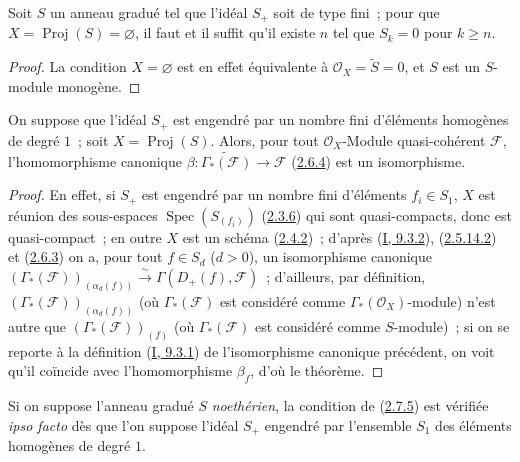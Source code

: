 \begin{corollary}[2.7.4]
\label{II.2.7.4-fr}
Soit $S$ un anneau gradué tel que l'idéal $S_+$ soit de type fini~; pour que
$X=\operatorname{Proj}(S)=\varnothing$, il faut et il suffit qu'il existe $n$
tel que $S_k=0$ pour $k\geq n$.
\end{corollary}

\begin{proof}
La condition $X=\varnothing$ est en effet équivalente à
$\mathcal{O}_X=\widetilde{S}=0$, et $S$ est un $S$-module monogène.
\end{proof}

\begin{theorem}[2.7.5]
\label{II.2.7.5-fr}
On suppose que l'idéal $S_+$ est engendré par un nombre fini d'éléments
homogènes de degré $1$~; soit $X=\operatorname{Proj}(S)$. Alors, pour tout
$\mathcal{O}_X$-Module quasi-cohérent $\mathcal{F}$, l'homomorphisme
canonique $\beta:\widetilde{\Gamma_*(\mathcal{F})}
\to\mathcal{F}$ (\hyperref[II.2.6.4-fr]{2.6.4}) est un isomorphisme.
\end{theorem}

\begin{proof}
En effet, si $S_+$ est engendré par un nombre fini d'éléments $f_i\in S_1$,
$X$ est réunion des sous-espaces $\operatorname{Spec}(S_{(f_i)})$
(\hyperref[II.2.3.6-fr]{2.3.6}) qui sont quasi-compacts, donc est
quasi-compact~; en outre $X$ est un schéma
(\hyperref[II.2.4.2-fr]{2.4.2})~; d'après
(\hyperref[I.9.3.2-fr]{I, 9.3.2}),
(\hyperref[II.2.5.14.2-fr]{2.5.14.2}) et
(\hyperref[II.2.6.3-fr]{2.6.3}) on a, pour tout $f\in S_d$ ($d>0$), un
isomorphisme canonique
$(\Gamma_*(\mathcal{F}))_{(\alpha_d(f))}\xrightarrow{\sim}
\Gamma(D_+(f),\mathcal{F})$~; d'ailleurs, par définition,
$(\Gamma_*(\mathcal{F}))_{(\alpha_d(f))}$ (où $\Gamma_*(\mathcal{F})$ est
considéré comme $\Gamma_*(\mathcal{O}_X)$-module) n'est autre que
$(\Gamma_*(\mathcal{F}))_{(f)}$ (où $\Gamma_*(\mathcal{F})$ est considéré
comme $S$-module)~; si on se reporte à la définition
(\hyperref[I.9.3.1-fr]{I, 9.3.1}) de l'isomorphisme canonique précédent, on
voit qu'il coïncide avec l'homomorphisme $\beta_f$, d'où le théorème.
\end{proof}

\begin{remark}[2.7.6]
\label{II.2.7.6-fr}
Si on suppose l'anneau gradué $S$ \emph{noethérien}, la condition de
(\hyperref[II.2.7.5-fr]{2.7.5}) est vérifiée \emph{ipso facto} dès que l'on
suppose l'idéal $S_+$ engendré par l'ensemble $S_1$ des éléments homogènes de
degré $1$.
\end{remark}

